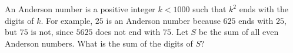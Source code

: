 An Anderson number is a positive integer $k<1000$ such that $k^{2}$ ends with the digits of $k$. For example, $25$ is an Anderson number because $625$ ends with $25$, but $75$ is not, since $5625$ does not end with $75$. Let $S$ be the sum of all even Anderson numbers. What is the sum of the digits of $S$?
